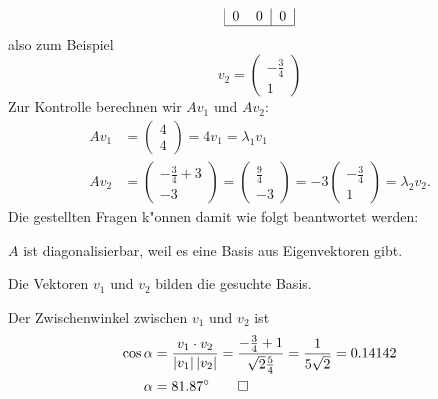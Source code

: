 \begin{loesung}
\begin{align*}
\begin{tabular}{|cc|c|}
0&0&0\\
\hline
\end{tabular}
\end{align*}
also zum Beispiel
\[
v_2=\begin{pmatrix}-\frac34\\1\end{pmatrix}
\]
Zur Kontrolle berechnen wir $Av_1$ und $Av_2$:
\begin{align*}
Av_1&=\begin{pmatrix}4\\4\end{pmatrix}=4v_1=\lambda_1v_1\\
Av_2&=\begin{pmatrix}-\frac34+3\\-3\end{pmatrix}
=\begin{pmatrix}\frac94\\-3\end{pmatrix}
=-3\begin{pmatrix}-\frac34\\1\end{pmatrix}=\lambda_2v_2.
\end{align*}
Die gestellten Fragen k"onnen damit wie folgt beantwortet werden:
\begin{teilaufgaben}
\item $A$ ist diagonalisierbar, weil es eine Basis aus Eigenvektoren gibt.
\item Die Vektoren $v_1$ und $v_2$ bilden die gesuchte Basis.
\item Der Zwischenwinkel zwischen $v_1$ und $v_2$ ist
\begin{align*}
\cos\alpha&=\frac{v_1\cdot v_2}{|v_1|\,|v_2|}
=
\frac{-\frac34+1}{\sqrt{2}\frac54}=\frac{1}{5\sqrt{2}}=0.14142\\
\alpha&=81.87^\circ
\qedhere
\end{align*}
\end{teilaufgaben}
\end{loesung}

